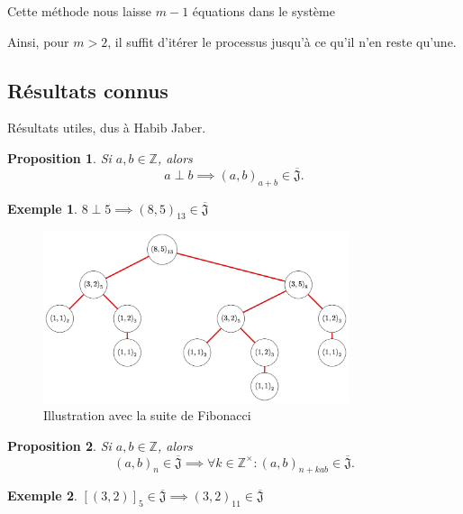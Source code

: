\documentclass{article}
\newtheorem{proposition}{Proposition}
\newtheorem{example}{Exemple}
\newcommand{\J}{\mathfrak{J}}
\newcommand{\JS}{\overline{\J}}
\begin{document}
Cette méthode nous laisse $m - 1$ équations dans le système

Ainsi, pour $m > 2$, il suffit d'itérer le processus jusqu'à ce qu'il n'en reste qu'une.

\newpage

\subsection{Résultats connus}
Résultats utiles, dus à Habib Jaber\cite{jaber2022stage}.

\begin{proposition}
    Si $a, b \in \mathbb{Z}$, alors
    \[ a \perp b \implies {(a, b)}_{a + b} \in \JS. \]
\end{proposition}

\begin{example}
    $8 \perp 5 \implies {(8, 5)}_{13} \in \JS$
\end{example}
\begin{figure}[h]
    \caption{Illustration avec la suite de Fibonacci}
    \centering
    \includegraphics[width=0.8\textwidth]{fibo}
\end{figure}

\begin{proposition}
    Si $a, b \in \mathbb{Z}$, alors
    \[ {(a, b)}_n \in \JS \implies \forall k \in \mathbb{Z}^\times : {(a, b)}_{n+kab} \in \JS. \]
\end{proposition}

\begin{example}
    ${[(3, 2)]}_5 \in \JS \implies {(3, 2)}_{11} \in \JS$
\end{example}
\end{document}
